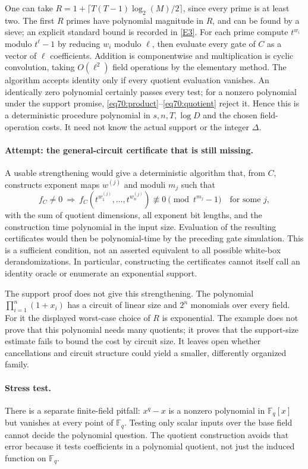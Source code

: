 \documentclass[11pt,a4paper]{article}
\numberwithin{equation}{section}
\newcommand{\F}{\mathbb{F}}
\newcommand{\eref}[2]{\hyperlink{extra:#1:#2}{[E#2]}}
\begin{document}
One can take
$R=1+\lceil T(T-1)\log_2(M)/2\rceil$, since every prime is at least two.
The first $R$ primes have polynomial magnitude in $R$, and can be found by
a sieve; an explicit standard bound is recorded in \eref{statement}{3}.
For each prime compute $t^{w_i}$ modulo $t^\ell-1$ by reducing $w_i$
modulo $\ell$, then evaluate every gate of $C$ as a vector of $\ell$
coefficients. Addition is componentwise and multiplication is cyclic
convolution, taking $O(\ell^2)$ field operations by the elementary method.
The algorithm accepts identity only if every quotient evaluation vanishes.
An identically zero polynomial certainly passes every test; for a nonzero
polynomial under the support promise, \eqref{eq70:product}--\eqref{eq70:quotient}
reject it. Hence this is a deterministic procedure polynomial in
$s,n,T,\log D$ and the chosen field-operation costs. It need not know the
actual support or the integer $\Delta$.

\paragraph{Attempt: the general-circuit certificate that is still missing.}
A usable strengthening would give a deterministic algorithm that, from $C$,
constructs exponent maps $w^{(j)}$ and moduli $m_j$ such that
\[
 f_C\ne0\ \Longrightarrow\
 f_C(t^{w^{(j)}_1},\ldots,t^{w^{(j)}_n})
          \not\equiv0\pmod{t^{m_j}-1}\quad\text{for some }j,
\]
with the sum of quotient dimensions, all exponent bit lengths, and the
construction time polynomial in the input size. Evaluation of the resulting
certificates would then be polynomial-time by the preceding gate simulation.
This is a sufficient condition, not an asserted equivalent to all possible
white-box derandomizations. In particular, constructing the certificates
cannot itself call an identity oracle or enumerate an exponential support.

The support proof does not give this strengthening. The polynomial
$\prod_{i=1}^n(1+x_i)$ has a circuit of linear size and $2^n$ monomials
over every field. For it the displayed worst-case choice of $R$ is
exponential. The example does not prove that this polynomial needs many
quotients; it proves that the support-size estimate fails to bound the
cost by circuit size. It leaves open whether cancellations and circuit
structure could yield a smaller, differently organized family.

\paragraph{Stress test.}
There is a separate finite-field pitfall: $x^q-x$ is a nonzero polynomial
in $\F_q[x]$ but vanishes at every point of $\F_q$. Testing only scalar
inputs over the base field cannot decide the polynomial question. The
quotient construction avoids that error because it tests coefficients in
a polynomial quotient, not just the induced function on $\F_q$.
\end{document}
